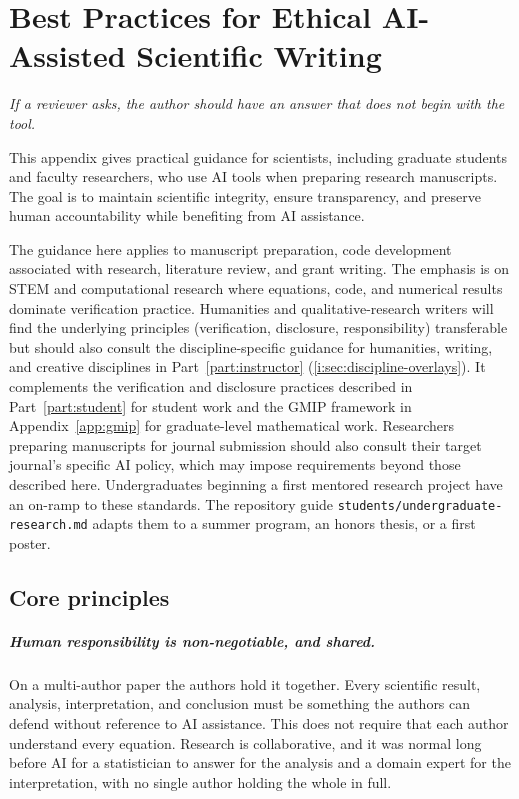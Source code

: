 \documentclass{SIAMbook2023}
\newcommand{\bookepigraph}[1]{%
  \begin{center}%
    \begin{minipage}{0.78\textwidth}%
      \centering\itshape #1%
    \end{minipage}%
  \end{center}%
  \vspace{0.6em}%
}
\begin{document}
\chapter{Best Practices for Ethical AI-Assisted Scientific Writing}
\label{app:ch:best-practices-for-ethical-ai-assisted-scientific-writing}%
\label{app:sciwriting}

\bookepigraph{If a reviewer asks, the author should have an answer that does not begin with the tool.}

This appendix gives practical guidance for scientists, including graduate students and faculty researchers, who use AI tools when preparing research manuscripts. The goal is to maintain scientific integrity, ensure transparency, and preserve human accountability while benefiting from AI assistance.

The guidance here applies to manuscript preparation, code development associated with research, literature review, and grant writing. The emphasis is on STEM and computational research where equations, code, and numerical results dominate verification practice. Humanities and qualitative-research writers will find the underlying principles (verification, disclosure, responsibility) transferable but should also consult the discipline-specific guidance for humanities, writing, and creative disciplines in Part~\ref{part:instructor} (\cref{i:sec:discipline-overlays}). It complements the verification and disclosure practices described in Part~\ref{part:student} for student work and the GMIP framework in Appendix~\ref{app:gmip} for graduate-level mathematical work. Researchers preparing manuscripts for journal submission should also consult their target journal's specific AI policy, which may impose requirements beyond those described here. Undergraduates beginning a first mentored research project have an on-ramp to these standards. The repository guide \texttt{students/undergraduate-research.md} adapts them to a summer program, an honors thesis, or a first poster.

\section{Core principles}

\paragraph{Human responsibility is non-negotiable, and shared.}
On a multi-author paper the authors hold it together. Every scientific result, analysis, interpretation, and conclusion must be something the authors can defend without reference to AI assistance. This does not require that each author understand every equation. Research is collaborative, and it was normal long before AI for a statistician to answer for the analysis and a domain expert for the interpretation, with no single author holding the whole in full.
\end{document}

